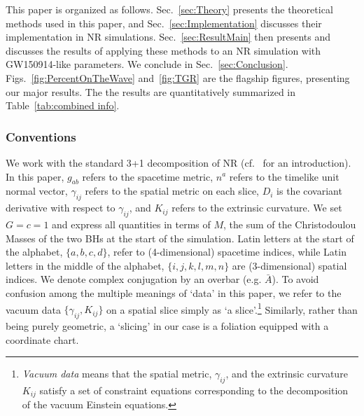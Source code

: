 This paper is organized as follows. Sec.~\ref{sec:Theory} presents the theoretical methods used in this paper, and Sec.~\ref{sec:Implementation} discusses their implementation in NR simulations. Sec.~\ref{sec:ResultMain} then presents and discusses the results of applying these methods to an NR simulation with GW150914-like parameters. We conclude in Sec.~\ref{sec:Conclusion}. Figs.~\ref{fig:PercentOnTheWave} and~\ref{fig:TGR} are the flagship figures, presenting our major results. The the results are quantitatively summarized in Table~\ref{tab:combined info}.

\subsubsection*{Conventions}
We work with the standard 3+1 decomposition of NR (cf.~\cite{baumgarteShapiroBook} for an introduction). In this paper, $g_{ab}$ refers to the spacetime metric, $n^a$ refers to the timelike unit normal vector, $\gamma_{ij}$ refers to the spatial metric on each slice, $D_i$ is the covariant derivative with respect to $\gamma_{ij}$, and $K_{ij}$ refers to the extrinsic curvature. We set $G = c = 1$ and express all quantities in terms of $M$, the sum of the Christodoulou Masses of the two BHs at the start of the simulation. Latin letters at the start of the alphabet, $\{a, b, c, d\}$, refer to (4-dimensional) spacetime indices, while Latin letters in the middle of the alphabet, $\{i,j,k,l,m,n\}$ are (3-dimensional) spatial indices. We denote complex conjugation by an overbar (e.g. $\bar{A}$). To avoid confusion among the multiple meanings of `data' in this paper, we refer to the vacuum data $\{\gamma_{ij}, K_{ij}\}$ on a spatial slice simply as `a slice'.\footnote{\textit{Vacuum data} means that the spatial metric, $\gamma_{ij}$, and the extrinsic curvature $K_{ij}$ satisfy a set of constraint equations corresponding to the decomposition of the vacuum Einstein equations.} Similarly, rather than being purely geometric, a `slicing' in our case is a foliation equipped with a coordinate chart.






